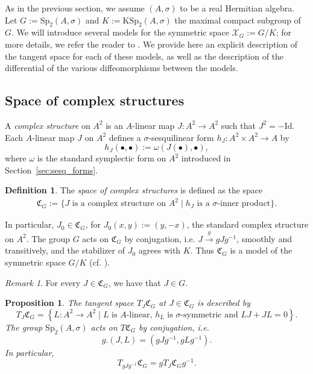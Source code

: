 \documentclass[oneside,11pt]{amsart}
\newtheorem{prop}[thm]{Proposition}
\theoremstyle{definition}
\newtheorem{defn}[thm]{Definition}
\theoremstyle{remark}
\newtheorem{rem}[thm]{Remark}
\numberwithin{thm}{section}
\numberwithin{equation}{section}
\begin{document}
As in the previous section, we assume $(A,\sigma)$ to be a real Hermitian algebra. Let $G:=\mathrm{Sp}_2(A,\sigma)$ and $K:=\mathrm{KSp}_2(A,\sigma)$ the maximal compact subgroup of $G$. We will introduce several models for the symmetric space $\mathcal{X}_{G}:=G/K$; for more details, we refer the reader to {\cite[Section 5]{ABRRW}}. We provide here an explicit description of the tangent space for each of these models, as well as the description of the differential of the various diffeomorphisms between the models.

\subsection{Space of complex structures}\label{sec_cplx-str-mod}
A \emph{complex structure} on $A^2$ is an $A$-linear map $J\colon A^2\to A^2$ such that $J^2=-\mathrm{Id}$. Each $A$-linear map $J$ on $A^2$ defines a $\sigma$-sesquilinear form $h_J\colon A^2\times A^2\to A$ by
$$
h_J(\bullet,\bullet):=\omega(J(\bullet),\bullet),
$$ 
where $\omega$ is the standard symplectic form on $A^2$ introduced in Section~\ref{sec:sesq_forms}. 

\begin{defn}
    The \emph{space of complex structures} is defined as the space
\begin{align*}
    \mathfrak{C}_G:=\{J\text{ is a complex structure on }A^2 \mid h_J\text{ is a $\sigma$-inner product}\}.
\end{align*}
\end{defn}
In particular, $J_0\in\mathfrak{C}_G$, for $J_0(x,y):=(y,-x)$, the standard complex structure on $A^2$. The group $G$ acts on $\mathfrak{C}_G$ by conjugation, i.e. $J\xrightarrow{g} gJg^{-1}$, smoothly and transitively, and the stabilizer of $J_0$ agrees with $K$. Thus $\mathfrak C_G$ is a model of the symmetric space $G/K$ (cf. \cite[Theorem 6.7]{ABRRW}). 

\begin{rem}
    For every $J\in\mathfrak{C}_G$, we have that $J\in G$.
\end{rem}

\begin{prop}\label{prop:tangent_scs}
    The tangent space $T_J\mathfrak{C}_G$ at $J\in \mathfrak{C}_G$ is described by
    $$T_J\mathfrak{C}_G=\left\{L\colon A^2\to A^2\mid \text{$L$ is $A$-linear, $h_L$ is $\sigma$-symmetric and }LJ+JL=0\right\}.$$
    The group $\mathrm{Sp}_2(A,\sigma)$ acts on $T\mathfrak{C}_G$  by conjugation, i.e. $$g.(J,L)=(gJg^{-1},gLg^{-1}).$$ 
    In particular, 
    $$T_{gJg^{-1}}\mathfrak{C}_G = gT_J\mathfrak{C}_Gg^{-1}.$$
\end{prop}
\end{document}
